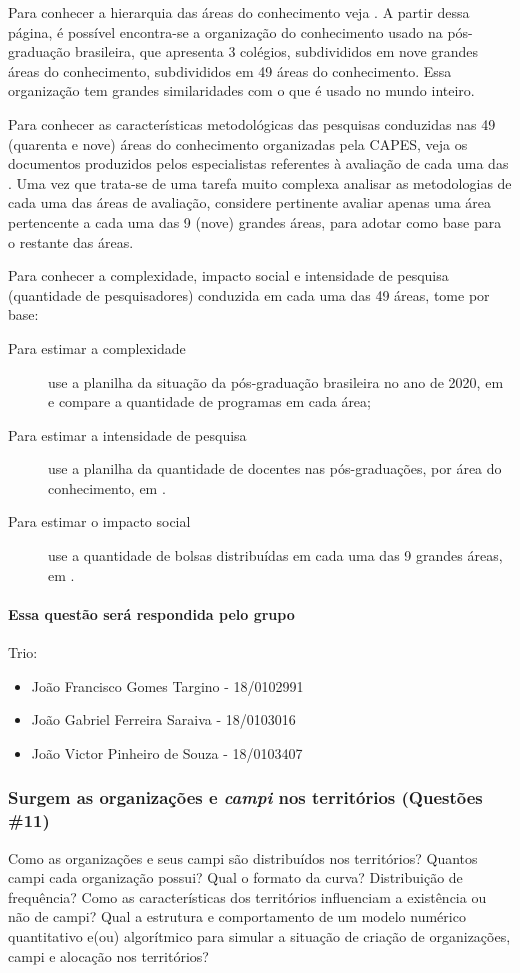 Para conhecer a hierarquia das áreas do conhecimento veja \cite{capes_tabela_2021}. A partir dessa página, é possível encontra-se a organização do conhecimento usado na pós-graduação brasileira, que apresenta 3 colégios, subdivididos em nove grandes áreas do conhecimento, subdivididos em 49 áreas do conhecimento. Essa organização tem grandes similaridades com o que é usado no mundo inteiro.

Para conhecer as características metodológicas das pesquisas conduzidas nas 49 (quarenta e nove) áreas do conhecimento organizadas pela CAPES, veja os documentos produzidos pelos especialistas referentes à avaliação de cada uma das  \cite{capes_documentos_2018}. Uma vez que trata-se de uma tarefa muito complexa analisar as metodologias de cada uma das áreas de avaliação, considere pertinente avaliar apenas uma área pertencente a cada uma das 9 (nove) grandes áreas, para adotar como base para o restante das áreas.

Para conhecer a complexidade, impacto social e intensidade de pesquisa (quantidade de pesquisadores) conduzida em cada uma das 49 áreas, tome por base:
\begin{description}
    \item [Para estimar a complexidade] use a planilha da situação da pós-graduação brasileira no ano de 2020, em \cite{capes_plataforma_2021} e compare a quantidade de programas em cada área;
    \item [Para estimar a intensidade de pesquisa] use a planilha da quantidade de docentes nas pós-graduações, por área do conhecimento, em \cite{capes_docentes_2020}. 
    \item [Para estimar o impacto social] use a quantidade de bolsas distribuídas em cada uma das 9 grandes áreas, em \cite{capes_geocapes_2021}.
\end{description}

\paragraph{Essa questão será respondida pelo grupo} 
Trio:
\begin{itemize}
    \item João Francisco Gomes Targino - 18/0102991
    \item João Gabriel Ferreira Saraiva - 18/0103016
    \item João Victor Pinheiro de Souza - 18/0103407
\end{itemize}

\subsubsection{Surgem as organizações e \textit{campi} nos territórios (Questões \#11)}
Como as organizações e seus campi são distribuídos nos territórios? Quantos campi cada organização possui? Qual o formato da curva? Distribuição de frequência? Como as características dos territórios influenciam a existência ou não de campi? Qual a estrutura e comportamento de um modelo numérico quantitativo e(ou) algorítmico para simular a situação de criação de organizações, campi e alocação nos territórios?

